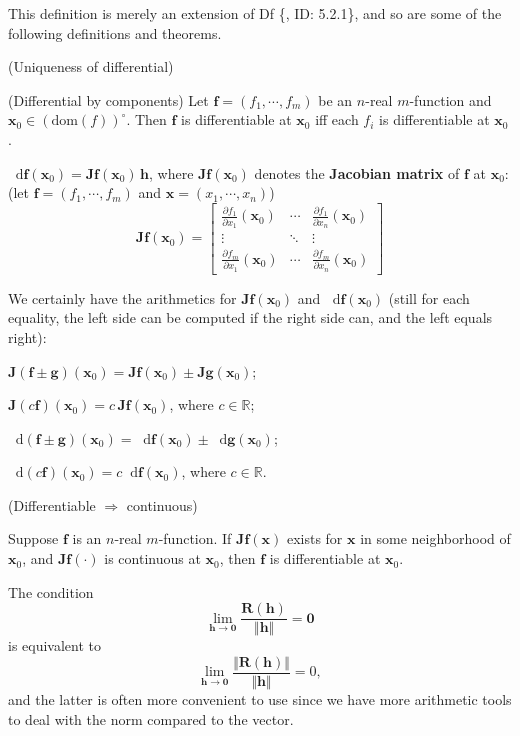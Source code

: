 \documentclass{article}
\newcommand{\parfrac}[2]{\frac{\partial #1}{\partial #2}}
\newcommand{\dif}{\mathop{}\!\mathrm{d}}
\begin{document}
\begin{Rmk}{}
    This definition is merely an extension of Df \{, ID: 5.2.1\}, and so are some of the following definitions and theorems.
    \begin{compactenum}
        \item \textcolor{Th}{(Uniqueness of differential)}
        \item \textcolor{Th}{(Differential by components) Let $\pmb{f} = (f_1, \cdots, f_m)$ be an $n$-real $m$-function and $\pmb{x}_0\in (\text{dom}(f))^\circ$. Then $\pmb{f}$ is differentiable at $\pmb{x}_0$ iff each $f_i$ is differentiable at $\pmb{x}_0$.}
        \item \textcolor{Th}{$\dif \pmb{f}(\pmb{x}_0) = \pmb{Jf}(\pmb{x}_0)\,\pmb{h}$,} \textcolor{Df}{where $\pmb{Jf}(\pmb{x}_0)$ denotes the \textbf{Jacobian matrix} of $\pmb{f}$ at $\pmb{x}_0$: (let $\pmb{f} = (f_1, \cdots, f_m)$ and $\pmb{x} = (x_1, \cdots, x_n)$)
        $$ \pmb{Jf}(\pmb{x}_0) = \begin{bmatrix}
            \parfrac{f_1}{x_1}(\pmb{x}_0) & \cdots & \parfrac{f_1}{x_n}(\pmb{x}_0)\\
            \vdots & \ddots & \vdots\\
            \parfrac{f_m}{x_1}(\pmb{x}_0) & \cdots & \parfrac{f_m}{x_n}(\pmb{x}_0)
        \end{bmatrix}
        $$}
        \item \textcolor{Th}{We certainly have the arithmetics for $\pmb{Jf}(\pmb{x}_0)$ and $\dif\pmb{f}(\pmb{x}_0)$ (still for each equality, the left side can be computed if the right side can, and the left equals right):
        \begin{compactenum}
            \item $\pmb{J}(\pmb{f\pm g})(\pmb{x}_0) = \pmb{Jf}(\pmb{x}_0)\pm\pmb{Jg}(\pmb{x}_0)$;
            \item $\pmb{J}(c\pmb{f})(\pmb{x}_0) = c\,\pmb{Jf}(\pmb{x}_0)$, where $c\in\mathbb{R}$;
            \item $\dif(\pmb{f}\pm\pmb{g})(\pmb{x}_0) = \dif \pmb{f}(\pmb{x}_0)\pm\dif \pmb{g}(\pmb{x}_0)$;
            \item $\dif(c\pmb{f})(\pmb{x}_0) = c\dif \pmb{f}(\pmb{x}_0)$, where $c\in\mathbb{R}$.
        \end{compactenum}}
        \item \textcolor{Th}{(Differentiable $\Rightarrow$ continuous)}
        \item \textcolor{Th}{Suppose $\pmb{f}$ is an $n$-real $m$-function. If $\pmb{Jf}(\pmb{x})$ exists for $\pmb{x}$ in some neighborhood of $\pmb{x}_0$, and $\pmb{Jf}(\cdot)$ is continuous at $\pmb{x}_0$, then $\pmb{f}$ is differentiable at $\pmb{x}_0$.}
        \item The condition 
        $$ \lim_{\pmb{h}\to \pmb{0}}\frac{\pmb{R}(\pmb{h})}{\Vert \pmb{h}\Vert} = \pmb{0} $$
        is equivalent to 
        $$ \lim_{\pmb{h}\to \pmb{0}}\frac{\Vert \pmb{R}(\pmb{h})\Vert}{\Vert \pmb{h}\Vert} = 0, $$
        and the latter is often more convenient to use since we have more arithmetic tools to deal with the norm compared to the vector.
    \end{compactenum}
\end{Rmk}
\end{document}
